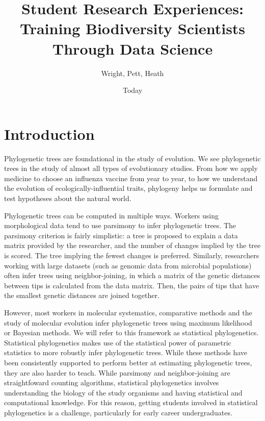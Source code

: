 \documentclass[]{article}
\begin{document}
\title{Student Research Experiences: Training Biodiversity Scientists Through Data Science}
\author{Wright, Pett, Heath}
\date{Today}
\maketitle

\section{Introduction}

Phylogenetic trees are foundational in the study of evolution. 
We see phylogenetic trees in the study of almost all types of evolutionary studies.
From how we apply medicine to choose an influenza vaccine from year to year, to how we understand the evolution of ecologically-influential traits, phylogeny helps us formulate and test hypotheses about the natural world. \par
Phylogenetic trees can be computed in multiple ways.
Workers using morphological data tend to use parsimony to infer phylogenetic trees.
The parsimony criterion is fairly simplistic: a tree is proposed to explain a data matrix provided by the researcher, and the number of changes implied by the tree is scored.
The tree implying the fewest changes is preferred. 
Similarly, researchers working with large datasets (such as genomic data from microbial populations)  often infer trees using neighbor-joining, in which a matrix of the genetic distances between tips is calculated from the data matrix.
Then, the pairs of tips that have the smallest genetic distances are joined together.
\par
However, most workers in molecular systematics, comparative methods and the study of molecular evolution infer phylogenetic trees using maximum likelihood or Bayesian methods.
We will refer to this framework as statistical phylogenetics.
Statistical phylogenetics makes use of the statistical power of parametric statistics to more robustly infer phylogenetic trees.
While these methods have been consistently supported to perform better at estimating phylogenetic trees, they are also harder to teach.
While parsimony and neighbor-joining are straightfoward counting algorithms, statistical phylogenetics involves understanding the biology of the study organisms and having statistical and computational knowledge. 
For this reason, getting students involved in statistical phylogenetics is a challenge, particularly for early career undergraduates. \par 
\end{document}

